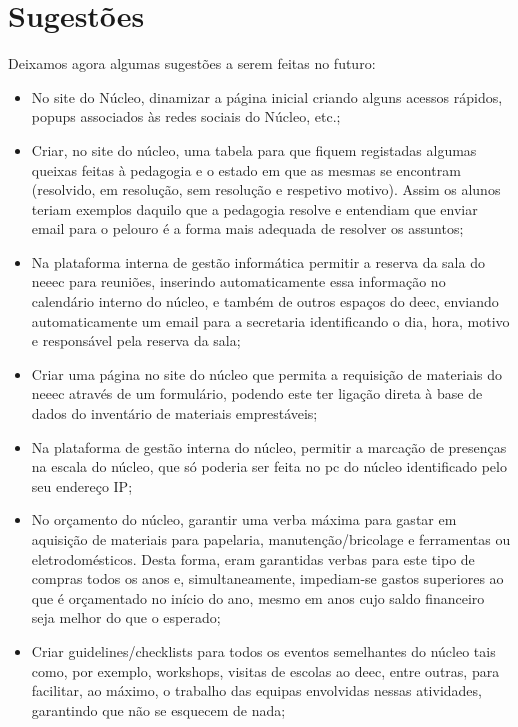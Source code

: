 
\section{Sugestões}

Deixamos agora algumas sugestões a serem feitas no futuro:
\begin{itemize}
\item No site do Núcleo, dinamizar a página inicial criando alguns acessos rápidos, popups associados às redes sociais do Núcleo, etc.;
\item Criar, no site do núcleo, uma tabela para que fiquem registadas algumas queixas feitas à pedagogia e o estado em que as mesmas se encontram (resolvido, em resolução, sem resolução e respetivo motivo). Assim os alunos teriam exemplos daquilo que a pedagogia resolve e entendiam que enviar email para o pelouro é a forma mais adequada de resolver os assuntos;
\item Na plataforma interna de gestão informática permitir a reserva da sala do \acrshort{neeec} para reuniões, inserindo automaticamente essa informação no calendário interno do núcleo, e também de outros espaços do \acrshort{deec}, enviando automaticamente um email para a secretaria identificando o dia, hora, motivo e responsável pela reserva da sala;
\item Criar uma página no site do núcleo que permita a requisição de materiais do \acrshort{neeec} através de um formulário, podendo este ter ligação direta à base de dados do inventário de materiais emprestáveis;
\item Na plataforma de gestão interna do núcleo, permitir a marcação de presenças na escala do núcleo, que só poderia ser feita no pc do núcleo identificado pelo seu endereço IP;
\item No orçamento do núcleo, garantir uma verba máxima para gastar em aquisição de materiais para papelaria, manutenção/bricolage e ferramentas ou eletrodomésticos. Desta forma, eram garantidas verbas para este tipo de compras todos os anos e, simultaneamente, impediam-se gastos superiores ao que é orçamentado no início do ano, mesmo em anos cujo saldo financeiro seja melhor do que o esperado;
\item Criar guidelines/checklists para todos os eventos semelhantes do núcleo tais como, por exemplo, workshops, visitas de escolas ao \acrshort{deec}, entre outras, para facilitar, ao máximo, o trabalho das equipas envolvidas nessas atividades, garantindo que não se esquecem de nada;

\end{itemize}
